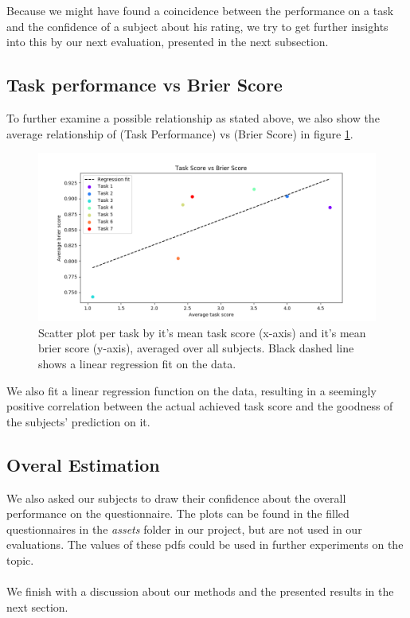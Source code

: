 \documentclass[../main/main.tex]{subfiles}
\begin{document}
\noindent Because we might have found a coincidence between the performance on a task and the confidence of a subject about his rating, we try to get further insights into this by our next evaluation, presented in the next subsection.

\subsection{Task performance vs Brier Score}
To further examine a possible relationship as stated above, we also show the average relationship of (Task Performance) vs (Brier Score) in figure \ref{fig:brier_vs_rating}.

\begin{figure}[H]
	\centering
	\includegraphics[width=\textwidth]{../assets/brier_vs_rating.png}
	\caption{Scatter plot per task by it's mean task score (x-axis) and it's mean brier score (y-axis), averaged over all subjects. Black dashed line shows a linear regression fit on the data.}
	\label{fig:brier_vs_rating} 
\end{figure}

\noindent We also fit a linear regression function on the data, resulting in a seemingly positive correlation between the actual achieved task score and the goodness of the subjects' prediction on it.

\subsection{Overal Estimation}
We also asked our subjects to draw their confidence about the overall performance on the questionnaire. The plots can be found in the filled questionnaires in the \textit{assets} folder in our project, but are not used in our evaluations. The values of these pdfs could be used in further experiments on the topic.
\\\\
We finish with a discussion about our methods and the presented results in the next section.
\end{document}
